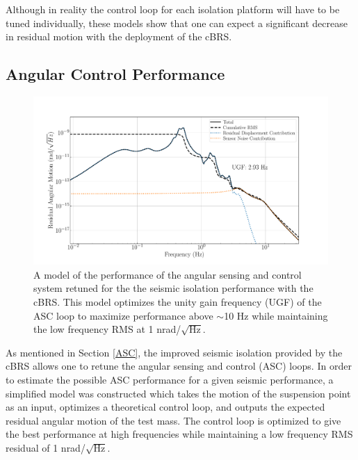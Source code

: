 \documentclass [12pt, proquest]{uwthesis}[2019]
\begin{document}
Although in reality the control loop for each isolation platform will have to be tuned individually, these models show that one can expect a significant decrease in residual motion with the deployment of the cBRS. 

\subsection{Angular Control Performance}

\begin{figure}[!h]
\begin{center}
\includegraphics[width=\textwidth]{cBRS_ASC_With.pdf}
\caption[Projected performance of the angular sensing and control system]{A model of the performance of the angular sensing and control system retuned for the the seismic isolation performance with the cBRS. This model optimizes the unity gain frequency (UGF) of the ASC loop to maximize performance above $\sim$10 Hz while maintaining the low frequency RMS at 1 nrad/$\sqrt{\text{Hz}}$.}
\label{ascWith}
\end{center}
\end{figure}

As mentioned in Section \ref{ASC}, the improved seismic isolation provided by the cBRS allows one to retune the angular sensing and control (ASC) loops. In order to estimate the possible ASC performance for a given seismic performance, a simplified model was constructed \cite{ascModel} which takes the motion of the suspension point as an input, optimizes a theoretical control loop, and outputs the expected residual angular motion of the test mass. The control loop is optimized to give the best performance at high frequencies while maintaining a low frequency RMS residual of 1 nrad/$\sqrt{\text{Hz}}$.
\end{document}
